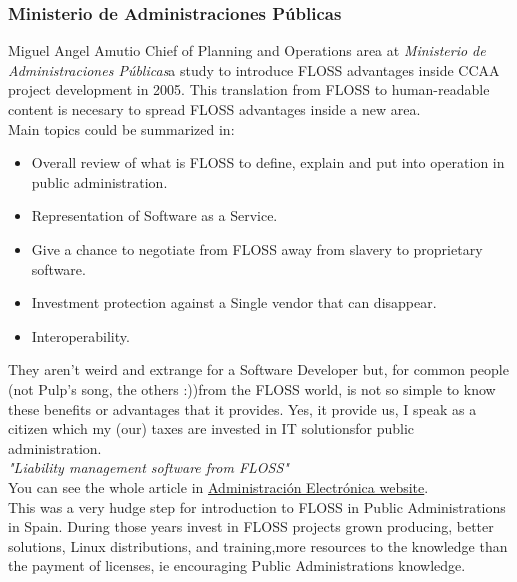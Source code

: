 \subsubsection{ Ministerio de Administraciones Públicas} Miguel Angel Amutio Chief of Planning and Operations area at \textit{Ministerio de Administraciones Públicas}\nolinebreakmade a study to introduce FLOSS advantages inside CCAA project development in 2005. This translation from FLOSS to human-readable content is necesary to spread FLOSS advantages inside a new area.
\\ Main topics could be summarized in:
\begin{itemize}
	\item Overall review of what is FLOSS to define, explain and put into operation in public administration.
	\item Representation of Software as a Service.
	\item Give a chance to negotiate from FLOSS away from slavery to proprietary software.
	\item Investment protection against a Single vendor that can disappear.
	\item Interoperability.
\end{itemize} They aren't weird and extrange for a Software Developer but, for common people (not Pulp's song, the others :))\nolinebreakaway from the FLOSS world, is not so simple to know these benefits or advantages that it provides. Yes, it provide us, I speak as a citizen which my (our) taxes are invested in IT solutions\nolinebreakdevelopment for public administration.\nolinebreak\textit{
\\}\textit{"Liability management software from FLOSS"}
\\ You can see the whole article in \href{http://administracionelectronica.gob.es/?_nfpb=true&amp;_pageLabel=P803324061272301226576&amp;langPae=es&amp;detalleLista=PAE_000001307}{Administración Electrónica website}.
\\ This was a very hudge step for introduction to FLOSS in Public Administrations in Spain. During those years invest in FLOSS projects grown producing, better solutions, Linux distributions, and training,\nolinebreakdevoting more resources to the knowledge than the payment of licenses, ie encouraging Public Administrations knowledge.

